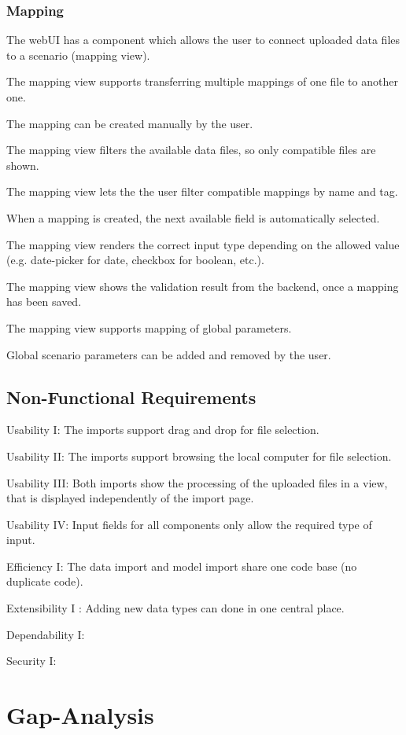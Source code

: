 \subsubsection{Mapping}
\reqstartF
\item The webUI has a component which allows the user to connect uploaded data files to a scenario (mapping view).
\item The mapping view supports transferring multiple mappings of one file to another one.
\item The mapping can be created manually by the user.
\item The mapping view filters the available data files, so only compatible files are shown.
\item The mapping view lets the the user filter compatible mappings by name and tag.
\item When a mapping is created, the next available field is automatically selected.
\item The mapping view renders the correct input type depending on the allowed value (e.g. date-picker for date, checkbox for boolean, etc.).
\item The mapping view shows the validation result from the backend, once a mapping has been saved.
\item The mapping view supports mapping of global parameters.
\item Global scenario parameters can be added and removed by the user.
\reqendF


\subsection{Non-Functional Requirements}
\reqstartNF
\item Usability I: The imports support drag and drop for file selection.
\item Usability II: The imports support browsing the local computer for file selection.
\item Usability III: Both imports show the processing of the uploaded files in a view, that is displayed independently of the import page.
\item Usability IV: Input fields for all components only allow the required type of input.

\item Efficiency I: The data import and model import share one code base (no duplicate code).
\item Extensibility I : Adding new data types can done in one central place.
\item Dependability I: 
\item Security I: 
\reqendNF



\section{Gap-Analysis}
